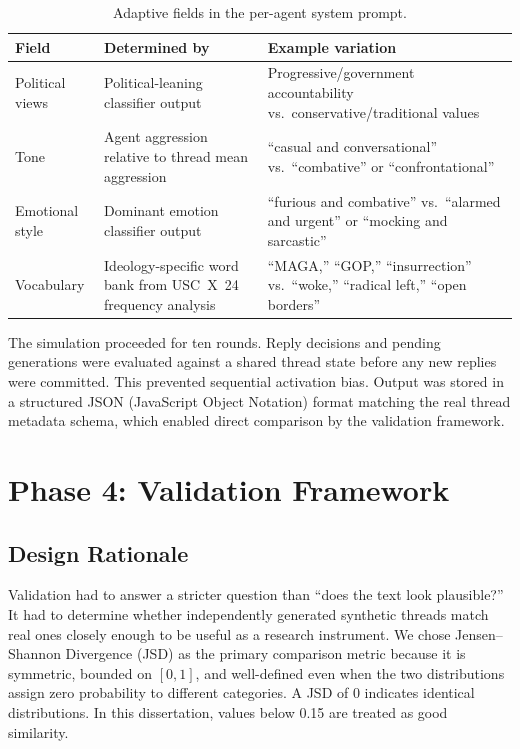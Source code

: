 \documentclass[logo,bsc,singlespacing,parskip,online]{infthesis}
\begin{document}
\begin{table}[ht]
\centering
\caption{Adaptive fields in the per-agent system prompt.}
\label{tab:adaptive_prompt_fields}
\begin{tabular}{p{}p{}p{}}
\toprule
\textbf{Field} & \textbf{Determined by} & \textbf{Example variation} \\
\midrule
Political views & Political-leaning classifier output & Progressive/government accountability vs.\ conservative/traditional values \\
Tone & Agent aggression relative to thread mean aggression & ``casual and conversational'' vs.\ ``combative'' or ``confrontational'' \\
Emotional style & Dominant emotion classifier output & ``furious and combative'' vs.\ ``alarmed and urgent'' or ``mocking and sarcastic'' \\
Vocabulary & Ideology-specific word bank from USC~X~24 frequency analysis & ``MAGA,'' ``GOP,'' ``insurrection'' vs.\ ``woke,'' ``radical left,'' ``open borders'' \\
\bottomrule
\end{tabular}
\end{table}

The simulation proceeded for ten rounds. Reply decisions and pending generations were evaluated against a shared thread state before any new replies were committed. This prevented sequential activation bias. Output was stored in a structured JSON (JavaScript Object Notation) format matching the real thread metadata schema, which enabled direct comparison by the validation framework.

\section{Phase 4: Validation Framework}

\subsection{Design Rationale}

Validation had to answer a stricter question than ``does the text look plausible?'' It had to determine whether independently generated synthetic threads match real ones closely enough to be useful as a research instrument. We chose Jensen--Shannon Divergence (JSD) as the primary comparison metric because it is symmetric, bounded on $[0, 1]$, and well-defined even when the two distributions assign zero probability to different categories. A JSD of 0 indicates identical distributions. In this dissertation, values below 0.15 are treated as good similarity.
\end{document}
